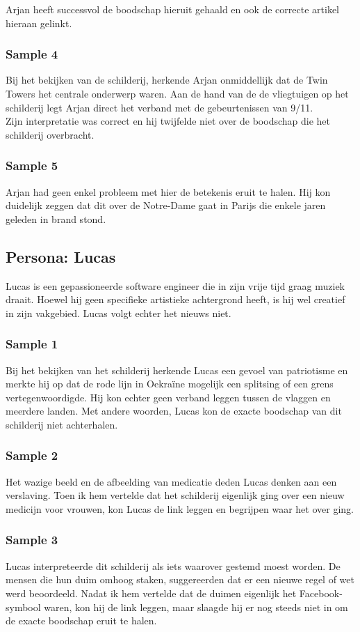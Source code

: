 Arjan heeft successvol de boodschap hieruit gehaald en ook de correcte artikel hieraan gelinkt. 

\subsubsection{Sample 4}
Bij het bekijken van de schilderij, herkende Arjan onmiddellijk dat de Twin Towers het centrale onderwerp waren. Aan de hand van de de vliegtuigen op het schilderij legt Arjan direct het verband met de gebeurtenissen van 9/11. \\

Zijn interpretatie was correct en hij twijfelde niet over de boodschap die het schilderij overbracht.

\subsubsection{Sample 5}
Arjan had geen enkel probleem met hier de betekenis eruit te halen. Hij kon duidelijk zeggen dat dit over de Notre-Dame gaat in Parijs die enkele jaren geleden in brand stond. 

\subsection{Persona: Lucas}
Lucas is een gepassioneerde software engineer die in zijn vrije tijd graag muziek draait. Hoewel hij geen specifieke artistieke achtergrond heeft, is hij wel creatief in zijn vakgebied. Lucas volgt echter het nieuws niet.
\subsubsection{Sample 1}
Bij het bekijken van het schilderij herkende Lucas een gevoel van patriotisme en merkte hij op dat de rode lijn in Oekraïne mogelijk een splitsing of een grens vertegenwoordigde. Hij kon echter geen verband leggen tussen de vlaggen en meerdere landen. Met andere woorden, Lucas kon de exacte boodschap van dit schilderij niet achterhalen.
\subsubsection{Sample 2}
Het wazige beeld en de afbeelding van medicatie deden Lucas denken aan een verslaving. Toen ik hem vertelde dat het schilderij eigenlijk ging over een nieuw medicijn voor vrouwen, kon Lucas de link leggen en begrijpen waar het over ging.
\subsubsection{Sample 3}
Lucas interpreteerde dit schilderij als iets waarover gestemd moest worden. De mensen die hun duim omhoog staken, suggereerden dat er een nieuwe regel of wet werd beoordeeld. Nadat ik hem vertelde dat de duimen eigenlijk het Facebook-symbool waren, kon hij de link leggen, maar slaagde hij er nog steeds niet in om de exacte boodschap eruit te halen.
